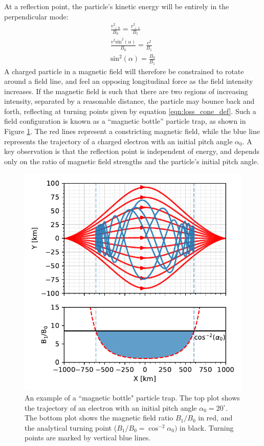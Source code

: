 \noindent At a reflection point, the particle's kinetic energy will be entirely in the perpendicular mode:
\begin{eqnarray}
\frac{v_{\perp0}^2}{B_0} = \frac{v_{\perp1}^2}{B_1} \\
\frac{v^2\mathrm{sin}^2(\alpha)}{B_0} = \frac{v^2}{B_1} \\
\mathrm{sin}^2(\alpha)=\frac{B_0}{B_1} 
\label{eqn:loss_cone_def}
\end{eqnarray}
\noindent A charged particle in a magnetic field will therefore be constrained to rotate around a field line, and feel an opposing longitudinal force as the field intensity increases. If the magnetic field is such that there are two regions of increasing intensity, separated by a reasonable distance,  the particle may bounce back and forth, reflecting at turning points given by equation \eqref{eqn:loss_cone_def}. Such a field configuration is known as a ``magnetic bottle'' particle trap, as shown in Figure \ref{fig:bottle}. The red lines represent a constricting magnetic field, while the blue line represents the trajectory of a charged electron with an initial pitch angle $\alpha_0$. A key observation is that the reflection point is independent of energy, and depends only on the ratio of magnetic field strengths and the particle's initial pitch angle.
\begin{figure}[ht]
\begin{center}
\includegraphics{figures/bottle_inverted.pdf}
\caption[An example of a ``magnetic bottle'' particle trap]{An example of a ``magnetic bottle" particle trap. The top plot shows the trajectory of an electron with an initial pitch angle $\alpha_0=20^\circ$. The bottom plot shows the magnetic field ratio $B_1/B_0$ in red, and the analytical turning point ($B_1/B_0 = \cos^{-2}\alpha_0)$ in black. Turning points are marked by vertical blue lines.}
\label{fig:bottle}
\end{center}
\end{figure}

